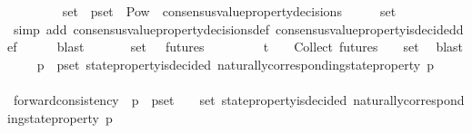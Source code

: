 \begin{isabellebody}
\ \ \ \ \isamarkupfalse%
\ \ {\isacartoucheopen}{\isasymsigma}\ {\isasymin}\ {\isasymsigma}{\isacharunderscore}set\ {\isasymand}\ p{\isacharunderscore}set\ {\isasymin}\ Pow\ {\isacharparenleft}{\isasymUnion}\ {\isacharbraceleft}consensus{\isacharunderscore}value{\isacharunderscore}property{\isacharunderscore}decisions\ {\isasymsigma}{\isacharprime}\ {\isacharbar}\ {\isasymsigma}{\isacharprime}{\isachardot}\ {\isasymsigma}{\isacharprime}\ {\isasymin}\ {\isasymsigma}{\isacharunderscore}set{\isacharbraceright}{\isacharparenright}\ {\isacharminus}\ {\isasymemptyset}{\isacartoucheclose}\isanewline
\ \ \ \ \isamarkupfalse%
\ {\isacharparenleft}simp\ add{\isacharcolon}\ consensus{\isacharunderscore}value{\isacharunderscore}property{\isacharunderscore}decisions{\isacharunderscore}def\ consensus{\isacharunderscore}value{\isacharunderscore}property{\isacharunderscore}is{\isacharunderscore}decided{\isacharunderscore}def{\isacharparenright}\isanewline
\ \ \ \ \isamarkupfalse%
\ blast\isanewline
\ \ \isamarkupfalse%
\ {\isachardoublequoteopen}{\isasymforall}\ {\isasymsigma}{\isacharprime}{\isacharprime}\ {\isasymin}\ {\isasymsigma}{\isacharunderscore}set{\isachardot}\ {\isasymsigma}{\isacharprime}\ {\isasymin}\ futures\ {\isasymsigma}{\isacharprime}{\isacharprime}{\isachardoublequoteclose}\isanewline
\ \ \ \ \isamarkupfalse%
\ {\isacartoucheopen}{\isasymsigma}{\isacharprime}\ {\isasymin}\ {\isasymSigma}t\ {\isasymand}\ {\isasymsigma}{\isacharprime}\ {\isasymin}\ {\isasymInter}{\isacharunderscore}Collect\ {\isacharparenleft}futures\ {\isasymsigma}{\isacharparenright}\ {\isacharparenleft}{\isasymsigma}\ {\isasymin}\ {\isasymsigma}{\isacharunderscore}set{\isacharparenright}{\isacartoucheclose}\ \isamarkupfalse%
\ blast\isanewline
\ \ \isamarkupfalse%
\ {\isachardoublequoteopen}{\isasymforall}\ p\ {\isasymin}\ p{\isacharunderscore}set{\isachardot}\ state{\isacharunderscore}property{\isacharunderscore}is{\isacharunderscore}decided\ {\isacharparenleft}naturally{\isacharunderscore}corresponding{\isacharunderscore}state{\isacharunderscore}property\ p{\isacharcomma}\ {\isasymsigma}{\isacharprime}{\isacharparenright}{\isachardoublequoteclose}\isanewline
\ \ \ \ \isamarkupfalse%
\ forward{\isacharunderscore}consistency\ {\isacartoucheopen}{\isasymforall}\ p\ {\isasymin}\ p{\isacharunderscore}set{\isachardot}\ {\isasymexists}\ {\isasymsigma}{\isacharprime}{\isacharprime}\ {\isasymin}\ {\isasymsigma}{\isacharunderscore}set{\isachardot}\ state{\isacharunderscore}property{\isacharunderscore}is{\isacharunderscore}decided\ {\isacharparenleft}naturally{\isacharunderscore}corresponding{\isacharunderscore}state{\isacharunderscore}property\ p{\isacharcomma}\ {\isasymsigma}{\isacharprime}{\isacharprime}{\isacharparenright}{\isacartoucheclose}\ \isanewline

\end{isabellebody}
